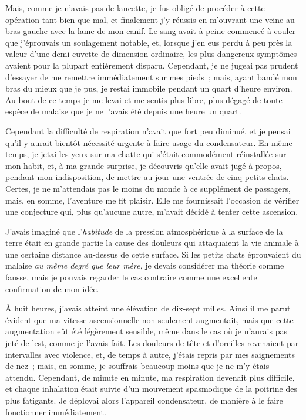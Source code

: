 \documentclass[french,twoside]{book} %
\begin{document}
Mais, comme je n’avais pas de lancette, je fus obligé de procéder à cette opération tant bien que mal, et finalement j’y réussis en m’ouvrant une veine au bras gauche avec la lame de mon canif. Le sang avait à peine commencé à couler que j’éprouvais un soulagement notable, et, lorsque j’en eus perdu à peu près la valeur d’une demi-cuvette de dimension ordinaire, les plus dangereux symptômes avaient pour la plupart entièrement disparu. Cependant, je ne jugeai pas prudent d’essayer de me remettre immédiatement sur mes pieds ; mais, ayant bandé mon bras du mieux que je pus, je restai immobile pendant un quart d’heure environ. Au bout de ce temps je me levai et me sentis plus libre, plus dégagé de toute espèce de malaise que je ne l’avais été depuis une heure un quart.\par
Cependant la difficulté de respiration n’avait que fort peu diminué, et je pensai qu’il y aurait bientôt nécessité urgente à faire usage du condensateur. En même temps, je jetai les yeux sur ma chatte qui s’était commodément réinstallée sur mon habit, et, à ma grande surprise, je découvris qu’elle avait jugé à propos, pendant mon indisposition, de mettre au jour une ventrée de cinq petits chats. Certes, je ne m’attendais pas le moins du monde à ce supplément de passagers, mais, en somme, l’aventure me fit plaisir. Elle me fournissait l’occasion de vérifier une conjecture qui, plus qu’aucune autre, m’avait décidé à tenter cette ascension.\par
J’avais imaginé que l’\emph{habitude} de la pression atmosphérique à la surface de la terre était en grande partie la cause des douleurs qui attaquaient la vie animale à une certaine distance au-dessus de cette surface. Si les petits chats éprouvaient du malaise \emph{au même degré que leur mère}, je devais considérer ma théorie comme fausse, mais je pouvais regarder le cas contraire comme une excellente confirmation de mon idée.\par
À huit heures, j’avais atteint une élévation de dix-sept milles. Ainsi il me parut évident que ma vitesse ascensionnelle non seulement augmentait, mais que cette augmentation eût été légèrement sensible, même dans le cas où je n’aurais pas jeté de lest, comme je l’avais fait. Les douleurs de tête et d’oreilles revenaient par intervalles avec violence, et, de temps à autre, j’étais repris par mes saignements de nez ; mais, en somme, je souffrais beaucoup moins que je ne m’y étais attendu. Cependant, de minute en minute, ma respiration devenait plus difficile, et chaque inhalation était suivie d’un mouvement spasmodique de la poitrine des plus fatigants. Je déployai alors l’appareil condensateur, de manière à le faire fonctionner immédiatement.\par
\end{document}
